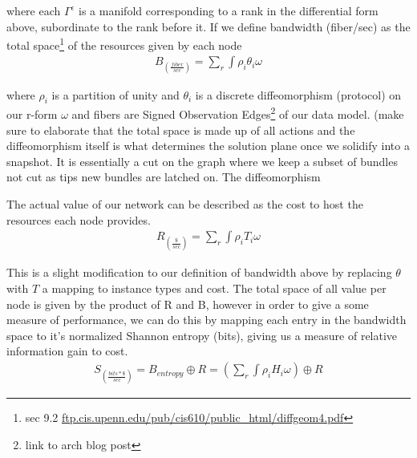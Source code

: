 \documentclass{article}
\begin{document}
where each $\Gamma^{\epsilon}$ is a manifold corresponding to a rank in the differential form above, subordinate to the rank before it. If we define bandwidth (fiber/sec) as the total space\footnote{sec 9.2 \url{ftp.cis.upenn.edu/pub/cis610/public_html/diffgeom4.pdf}} of the resources given by each node
\begin{equation*} \label{eq1}
\begin{split}
B_{(\frac{fiber}{sec})} = \sum_{r} \int \rho_i \theta_i \omega
\end{split}
\end{equation*}

where $\rho_i$ is a partition of unity and $\theta_i$ is a discrete diffeomorphism (protocol) on our r-form $\omega$ and fibers are Signed Observation Edges\footnote{link to arch blog post} of our data model. (make sure to elaborate that the total space is made up of all actions and the diffeomorphism itself is what determines the solution plane once we solidify into a snapshot. It is essentially a cut on the graph where we keep a subset of bundles not cut as tips new bundles are latched on. The diffeomorphism

The actual value of our network can be described as the cost to host the resources each node provides. 
\begin{equation*} \label{eq1}
\begin{split}
R_{(\frac{\$}{sec})} = \sum_{r} \int \rho_i T_i \omega
\end{split}
\end{equation*}

This is a slight modification to our definition of bandwidth above by replacing $\theta$ with $T$ a mapping to instance types and cost. The total space of all value per node is given by the product of R and B, however in order to give a some measure of performance, we can do this by mapping each entry in the bandwidth space to it's normalized Shannon entropy (bits), giving us a measure of relative information gain to cost.
\begin{equation*} \label{eq1}
\begin{split}
S_{(\frac{bits*\$}{sec})} = B_{entropy} \oplus R = (\sum_{r} \int \rho_i H_i \omega ) \oplus R
\end{split}
\end{equation*}
\end{document}
